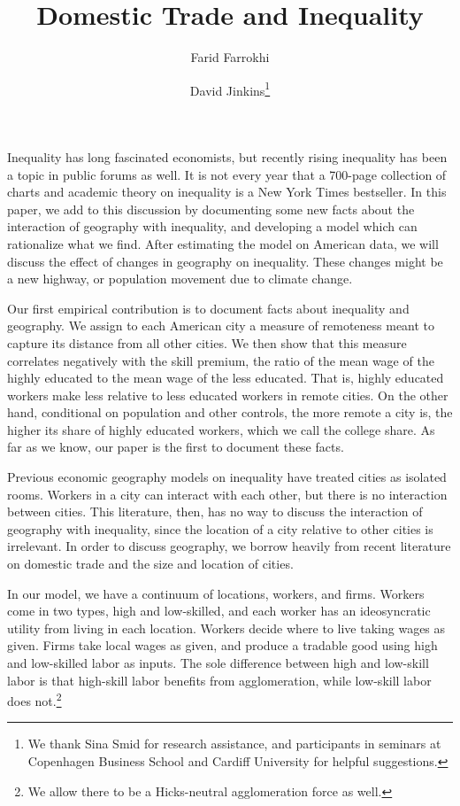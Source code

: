 \documentclass{article}
\title{Domestic Trade and Inequality}
\author[1]{Farid Farrokhi}
\author[2]{David Jinkins\thanks{We thank Sina Smid for research assistance, and participants in seminars at Copenhagen Business School and Cardiff University for helpful suggestions.}}
\affil[1]{Penn State}
\affil[2]{Copenhagen Business School}
\begin{document}
\maketitle

Inequality has long fascinated economists, but recently rising inequality has been a topic in public forums as well.  It is not every year that a 700-page collection of charts and academic theory on inequality is a New York Times bestseller.  In this paper, we add to this discussion by documenting some new facts about the interaction of geography with inequality, and developing a model which can rationalize what we find.  After estimating the model on American data, we will discuss the effect of changes in geography on inequality.  These changes might be a new highway, or population movement due to climate change.

Our first empirical contribution is to document facts about inequality and geography.  We assign to each American city a measure of remoteness meant to capture its distance from all other cities.  We then show that this measure correlates negatively with the skill premium, the ratio of the mean wage of the highly educated to the mean wage of the less educated.  That is, highly educated workers make less relative to less educated workers in remote cities.  On the other hand, conditional on population and other controls, the more remote a city is, the higher its share of highly educated workers, which we call the college share.  As far as we know, our paper is the first to document these facts.

Previous economic geography models on inequality have treated cities as isolated rooms.  Workers in a city can interact with each other, but there is no interaction between cities.  This literature, then, has no way to discuss the interaction of geography with inequality, since the location of a city relative to other cities is irrelevant.  In order to discuss geography, we borrow heavily from recent literature on domestic trade and the size and location of cities.

In our model, we have a continuum of locations, workers, and firms.  Workers come in two types, high and low-skilled, and each worker has an ideosyncratic utility from living in each location.  Workers decide where to live taking wages as given.  Firms take local wages as given, and produce a tradable good using high and low-skilled labor as inputs.  The sole difference between high and low-skill labor is that high-skill labor benefits from agglomeration, while low-skill labor does not.\footnote{We allow there to be a Hicks-neutral agglomeration force as well.}
\end{document}
